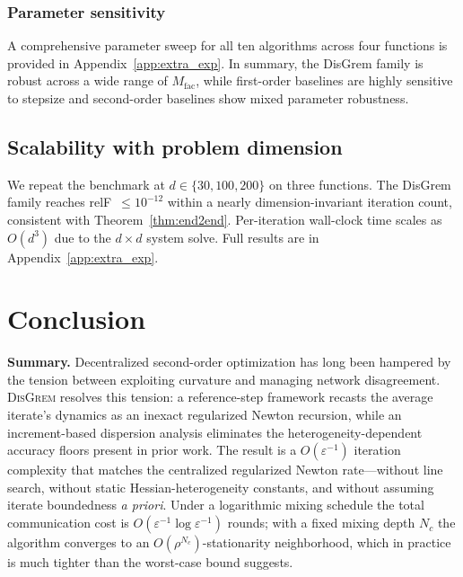 \documentclass[10pt,twocolumn,letterpaper]{article}
\def\cO{O}%
\theoremstyle{compact}
\theoremstyle{compactremark}
\newcommand{\cO}{\mathcal{O}}
\begin{document}
	\subsubsection{Parameter sensitivity}
	A comprehensive parameter sweep for all ten algorithms across four functions
	is provided in Appendix~\ref{app:extra_exp}.
	In summary, the DisGrem family is robust across a wide range of $M_{\mathrm{fac}}$,
	while first-order baselines are highly sensitive to stepsize
	and second-order baselines show mixed parameter robustness.
	
	
	\subsection{Scalability with problem dimension}\label{ssec:scalability}
	
	We repeat the benchmark at $d\in\{30,100,200\}$ on three functions.
	The DisGrem family reaches relF~$\le 10^{-12}$ within a nearly
	dimension-invariant iteration count, consistent with
	Theorem~\ref{thm:end2end}. Per-iteration wall-clock time scales as
	$\cO(d^3)$ due to the $d\times d$ system solve.
	Full results are in Appendix~\ref{app:extra_exp}.
	
	
\section{Conclusion}
	
	\noindent\textbf{Summary.}
	Decentralized second-order optimization has long been
	hampered by the tension between exploiting curvature and
	managing network disagreement.
	\textsc{DisGrem} resolves this tension: a reference-step
	framework recasts the average iterate's dynamics as an inexact
	regularized Newton recursion, while an increment-based
	dispersion analysis eliminates the heterogeneity-dependent
	accuracy floors present in prior work.
	The result is a $\cO(\varepsilon^{-1})$ iteration complexity
	that matches the centralized regularized Newton rate---without
	line search, without static Hessian-heterogeneity constants,
	and without assuming iterate boundedness \emph{a priori}.
	Under a logarithmic mixing schedule the total communication
	cost is $\cO(\varepsilon^{-1}\log\varepsilon^{-1})$ rounds;
	with a fixed mixing depth $N_c$ the algorithm converges to an
	$\cO(\rho^{N_c})$-stationarity neighborhood, which in practice
	is much tighter than the worst-case bound suggests.
	
\end{document}
